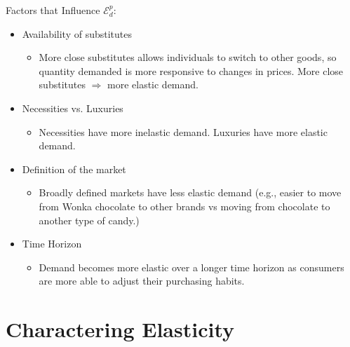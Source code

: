 \documentclass[xcolor={dvipsnames},pdf, hyperref={colorlinks=true, citecolor=ForestGreen, linkcolor=BlueViolet, urlcolor=Magenta}]{beamer}
\begin{document}
	
\begin{frame}{Factors that Influence $\mathcal{E}_d^p$:}
		\begin{itemize}
		\item Availability of substitutes 
		\begin{itemize}
			\item More close substitutes allows individuals to switch to other goods, so quantity demanded is more responsive to changes in prices. More close substitutes  $\Rightarrow$ more elastic demand.
		\end{itemize}
		\item Necessities vs. Luxuries
		\begin{itemize}
			\item Necessities have more inelastic demand. Luxuries have more elastic demand.
		\end{itemize}
		\item Definition of the market
		\begin{itemize}
			\item Broadly defined markets have less elastic demand (e.g., easier to move from Wonka chocolate to other brands vs moving from chocolate to another type of candy.)
		\end{itemize}
		\item Time Horizon
		\begin{itemize}
			\item Demand becomes more elastic over a longer time horizon as consumers are more able to adjust their purchasing habits.
		\end{itemize}
		\end{itemize}
\end{frame}

\section{Charactering Elasticity}
	
\end{document}
